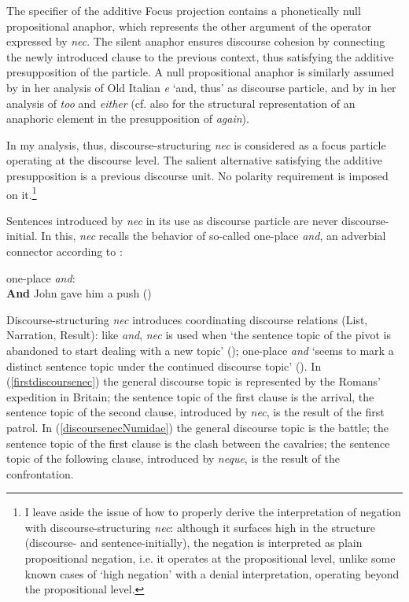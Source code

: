 \documentclass[output=paper,modfonts,nonflat,citecolor=brown,
showindex
]{langsci/langscibook}
\begin{document}
The specifier of the additive Focus projection contains a phonetically null propositional anaphor, which represents the other argument of the operator expressed by {\em{nec}}. The silent anaphor ensures discourse cohesion by connecting the newly introduced clause to the previous context, thus satisfying the additive presupposition of the particle. A null propositional anaphor is similarly assumed by \citet[22-27]{Poletto14} in her analysis of Old Italian {\em{e}} `and, thus' as discourse particle, and by \citet{Ahn15} in her analysis of {\em{too}} and {\em{either}} (cf. also \citealt[]{Beck06} for the structural representation of an anaphoric element in the presupposition of {\em{again}}). 

In my analysis, thus, discourse-structuring {\em{nec}} is considered as a focus particle operating at the discourse level. The salient alternative satisfying the additive presupposition is a previous discourse unit. No polarity requirement is imposed on it.{\footnote{I leave aside the issue of how to properly derive the interpretation of negation with discourse-structuring {\em{nec}}: although it surfaces high in the structure (discourse- and sentence-initially), the negation is interpreted as plain propositional negation, i.e. it operates at the propositional level, unlike some known cases of `high negation' with a denial interpretation, operating beyond the propositional level.}} 
 
Sentences introduced by {\em{nec}} in its use as discourse particle are never discourse-initial. In this, {\em{nec}} recalls the behavior of so-called one-place {\em{and}}, an adverbial connector according to \citet[]{ZeevatJasinskaja07}: 
 
{\begin{exe}
\ex one-place {\em{and}}:\\
{\bf{And}} John gave him a push (\citealt[their ex. 7]{ZeevatJasinskaja07})
\end{exe}}
 
 \noindent Discourse-structuring {\em{nec}} introduces coordinating discourse relations (List, Narration, Result): like {\em{and}}, {\em{nec}} is used when `the sentence topic of the pivot is abandoned to start dealing with a new topic' (\citealt[325]{ZeevatJasinskaja07}); one-place {\em{and}} `seems to mark a distinct sentence topic under the continued discourse topic' (\citealt[325]{ZeevatJasinskaja07}). In (\ref{firstdiscoursenec}) the general discourse topic is represented by the Romans' expedition in Britain; the sentence topic of the first clause is the arrival, the sentence topic of the second clause, introduced by {\em{nec}}, is the result of the first patrol. In (\ref{discoursenecNumidae}) the general discourse topic is the battle; the sentence topic of the first clause is the clash between the cavalries; the sentence topic of the following clause, introduced by {\em{neque}}, is the result of the confrontation. 
 
\end{document}
